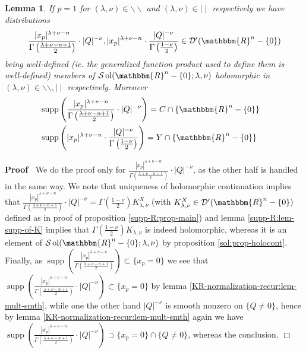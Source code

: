 \documentclass{article}
\newcommand{\tmop}[1]{\ensuremath{\operatorname{#1}}}
\renewenvironment{proof}{\noindent\textbf{Proof\ }}{\hspace*{\fill}$\Box$\medskip}
\newtheorem{lemma}[proposition]{Lemma}
\theoremstyle{remark}
\begin{document}
\begin{lemma}
  \label{supp-sing:lem-strangeelement}If $p = 1$ for $(\lambda, \nu) \in
  \backslash\backslash$ and $(\lambda, \nu) \in \mid \mid$ respectively we
  have distributions
  \[ \frac{| x_p |^{\lambda + \nu - n}}{\Gamma \left( \frac{\lambda + \nu - n
     + 1}{2} \right)} \cdot | Q |^{- \nu}, | x_p |^{\lambda + \nu - n} \cdot
     \frac{| Q |^{- \nu}}{\Gamma \left( \frac{1 - \nu}{2} \right)} \in
     \mathcal{D}' (\mathbbm{R}^n - \{ 0 \}) \]
  being well-defined (ie. the generalized function product used to define them
  is well-defined) members of $\mathcal{S} \tmop{ol} (\mathbbm{R}^n - \{ 0 \}
  ; \lambda, \nu)$ holomorphic in $(\lambda, \nu) \in \backslash\backslash,
  \mid \mid$ respectively. Moreover
  \begin{eqnarray}
    & \tmop{supp} \left( \frac{| x_p |^{\lambda + \nu - n}}{\Gamma \left(
    \frac{\lambda + \nu - n + 1}{2} \right)} \cdot | Q |^{- \nu} \right) = C
    \cap \{ \mathbbm{R}^n - \{ 0 \} \} &  \nonumber\\
    & \tmop{supp} \left( | x_p |^{\lambda + \nu - n} \cdot \frac{| Q |^{-
    \nu}}{\Gamma \left( \frac{1 - \nu}{2} \right)} \right) = Y \cap \{
    \mathbbm{R}^n - \{ 0 \} \} &  \nonumber
  \end{eqnarray}
\end{lemma}

\begin{proof}
  We do the proof only for $\frac{| x_p |^{\lambda + \nu - n}}{\Gamma \left(
  \frac{\lambda + \nu - n + 1}{2} \right)} \cdot | Q |^{- \nu}$, as the other
  half is handled in the same way. We note that uniqueness of holomorphic
  continuation implies that $\frac{| x_p |^{\lambda + \nu - n}}{\Gamma \left(
  \frac{\lambda + \nu - n + 1}{2} \right)} \cdot | Q |^{- \nu} = \Gamma \left(
  \frac{1 - \nu}{2} \right) K_{\lambda, \nu}^X$ (with $K_{\lambda, \nu}^X \in
  \mathcal{D}' (\mathbbm{R}^n - \{ 0 \})$ defined as in proof of proposition
  \ref{supp-R:prop-main}) and lemma \ref{supp-R:lem-supp-of-K} implies that
  $\Gamma \left( \frac{1 - \nu}{2} \right) K_{\lambda, \nu}$ is indeed
  holomorphic, whereas it is an element of $\mathcal{S} \tmop{ol}
  (\mathbbm{R}^n - \{ 0 \} ; \lambda, \nu)$ by proposition
  \ref{sol:prop-holocont}. Finally, as $\tmop{supp} \left( \frac{| x_p
  |^{\lambda + \nu - n}}{\Gamma \left( \frac{\lambda + \nu - n + 1}{2}
  \right)} \right) \subset \{ x_p = 0 \}$ we see that $\tmop{supp} \left(
  \frac{| x_p |^{\lambda + \nu - n}}{\Gamma \left( \frac{\lambda + \nu - n +
  1}{2} \right)} \cdot | Q |^{- \nu} \right) \subset \{ x_p = 0 \}$ by lemma
  \ref{KR-normalization-recur:lem-mult-smth}, while one the other hand $| Q
  |^{- \nu}$ is smooth nonzero on $\{ Q \neq 0 \}$, hence by lemma
  \ref{KR-normalization-recur:lem-mult-smth} again we have $\tmop{supp} \left(
  \frac{| x_p |^{\lambda + \nu - n}}{\Gamma \left( \frac{\lambda + \nu - n +
  1}{2} \right)} \cdot | Q |^{- \nu} \right) \supset \{ x_p = 0 \} \cap \{ Q
  \neq 0 \}$, whereas the conclusion.
\end{proof}
\end{document}
